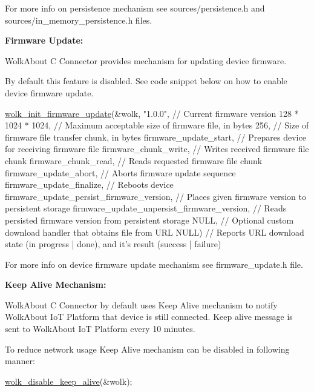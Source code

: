 For more info on persistence mechanism see {\ttfamily sources/persistence.\+h} and {\ttfamily sources/in\+\_\+memory\+\_\+persistence.\+h} files.

{\bfseries Firmware Update\+:}

Wolk\+About C Connector provides mechanism for updating device firmware.

By default this feature is disabled. See code snippet below on how to enable device firmware update.


\begin{DoxyCode}
\hyperlink{wolk__connector_8h_a077b59e55a348cd2601bb269a04c77d6}{wolk\_init\_firmware\_update}(&wolk,
                          \textcolor{stringliteral}{"1.0.0"},                                      \textcolor{comment}{// Current firmware version}
                          128 * 1024 * 1024,                            \textcolor{comment}{// Maximum acceptable size of
       firmware file, in bytes}
                          256,                                          \textcolor{comment}{// Size of firmware file transfer
       chunk, in bytes}
                          firmware\_update\_start,                        \textcolor{comment}{// Prepares device for receiving
       firmware file}
                          firmware\_chunk\_write,                         \textcolor{comment}{// Writes received firmware file
       chunk}
                          firmware\_chunk\_read,                          \textcolor{comment}{// Reads requested firmware file
       chunk}
                          firmware\_update\_abort,                        \textcolor{comment}{// Aborts firmware update sequence}
                          firmware\_update\_finalize,                     \textcolor{comment}{// Reboots device}
                          firmware\_update\_persist\_firmware\_version,     \textcolor{comment}{// Places given firmware version to
       persistent storage}
                          firmware\_update\_unpersist\_firmware\_version,   \textcolor{comment}{// Reads persisted firmware version
       from persistent storage}
                          NULL,                                         \textcolor{comment}{// Optional custom download handler
       that obtains file from URL}
                          NULL)                                         \textcolor{comment}{// Reports URL download state (in
       progress | done), and it's result (success | failure)}
\end{DoxyCode}


For more info on device firmware update mechanism see {\ttfamily firmware\+\_\+update.\+h} file.

{\bfseries Keep Alive Mechanism\+:}

Wolk\+About C Connector by default uses Keep Alive mechanism to notify Wolk\+About IoT Platform that device is still connected. Keep alive message is sent to Wolk\+About IoT Platform every 10 minutes.

To reduce network usage Keep Alive mechanism can be disabled in following manner\+:


\begin{DoxyCode}
\hyperlink{wolk__connector_8h_ac04ee6d0e9cac773f77a57b89383c715}{wolk\_disable\_keep\_alive}(&wolk);
\end{DoxyCode}
 